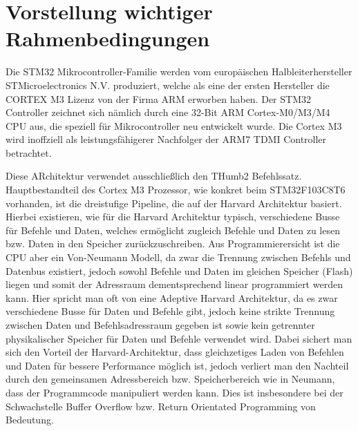 \documentclass[a4paper,
DIV=13,
12pt,
BCOR=10mm,
department=FakIM,
oneside,
parskip=half,
automark,
listof=totocnumbered,
bibliography=totocnumbered,
acronym=totocnumbered
] {OTHRartcl}
\begin{document}
\section{Vorstellung wichtiger Rahmenbedingungen}




Die STM32 Mikrocontroller-Familie werden vom europäischen Halbleiterhersteller STMicroelectronics N.V. produziert, welche als eine der ersten Hersteller
die CORTEX M3 Lizenz von der Firma ARM erworben haben.
Der STM32 Controller zeichnet sich nämlich durch eine 32-Bit ARM Cortex-M0/M3/M4 CPU aus, die speziell für Mikrocontroller neu entwickelt wurde.
Die Cortex M3 wird inoffziell als leistungsfähigerer Nachfolger der ARM7 TDMI Controller betrachtet.

Diese ARchitektur verwendet ausschließlich den THumb2 Befehlssatz.
Hauptbestandteil des Cortex M3 Prozessor, wie konkret beim STM32F103C8T6 vorhanden, ist die dreistufige Pipeline, die auf der Harvard Architektur basiert.
Hierbei existieren, wie für die Harvard Architektur typisch, verschiedene Busse für Befehle und Daten, welches ermöglicht zugleich Befehle und Daten zu lesen bzw. Daten in den Speicher zurückzuschreiben.
Aus Programmierersicht ist die CPU aber ein Von-Neumann Modell, da zwar die Trennung zwischen Befehls und Datenbus existiert, jedoch sowohl Befehle und Daten im gleichen Speicher (Flash) liegen und
somit der Adressraum dementsprechend linear programmiert werden kann.
Hier spricht man oft von eine Adeptive Harvard Architektur, da es zwar verschiedene Busse für Daten und Befehle gibt, jedoch keine strikte Trennung zwischen Daten und Befehlsadressraum gegeben ist sowie
kein getrennter physikalischer Speicher für Daten und Befehle verwendet wird.
Dabei sichert man sich den Vorteil der Harvard-Architektur, dass gleichzetiges Laden von Befehlen und Daten für bessere Performance möglich ist, jedoch
verliert man den Nachteil durch den gemeinsamen Adressbereich bzw. Speicherbereich wie in Neumann, dass der Programmcode manipuliert werden kann.
Dies ist insbesondere bei der Schwachstelle Buffer Overflow bzw. Return Orientated Programming von Bedeutung.
\end{document}
